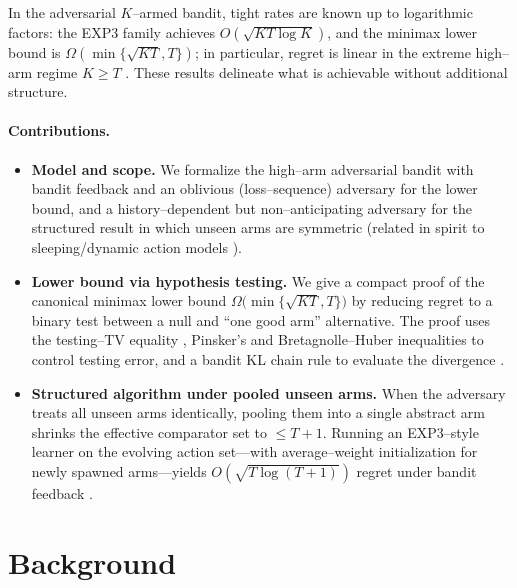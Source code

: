 \documentclass[10pt,twocolumn]{article}
\theoremstyle{definition}
\theoremstyle{remark}
\begin{document}
In the adversarial $K$–armed bandit, tight rates are known up to logarithmic factors: the EXP3 family achieves $O(\sqrt{KT\log K})$, and the minimax lower bound is $\Omega(\min\{\sqrt{KT},T\})$; in particular, regret is linear in the extreme high–arm regime $K\ge T$ \citep{Auer2002Nonstochastic,BubeckCesaBianchi2012,LS20}. These results delineate what is achievable without additional structure.

\paragraph{Contributions.}
\begin{itemize}
  \item \textbf{Model and scope.} We formalize the high–arm adversarial bandit with bandit feedback and an oblivious (loss–sequence) adversary for the lower bound, and a history–dependent but non–anticipating adversary for the structured result in which unseen arms are symmetric (related in spirit to sleeping/dynamic action models \citep{Kleinberg2010Sleeping}).
  \item \textbf{Lower bound via hypothesis testing.} We give a compact proof of the canonical minimax lower bound
        $\Omega\!\big(\min\{\sqrt{KT},T\}\big)$ by reducing regret to a binary test between a null and “one good arm” alternative. The proof uses the testing–TV equality \citep{Tsybakov2009}, Pinsker’s and Bretagnolle–Huber inequalities \citep{CoverThomas2006,BretagnolleHuber1979} to control testing error, and a bandit KL chain rule to evaluate the divergence \citep{Auer2002Nonstochastic,LS20,BubeckCesaBianchi2012}.
  \item \textbf{Structured algorithm under pooled unseen arms.} When the adversary treats all unseen arms identically, pooling them into a single abstract arm shrinks the effective comparator set to $\le T{+}1$. Running an EXP3–style learner on the evolving action set—with average–weight initialization for newly spawned arms—yields $O(\sqrt{T\log(T{+}1)})$ regret under bandit feedback \citep[cf.][]{Auer2002Nonstochastic,Kleinberg2010Sleeping}.
\end{itemize}


\section{Background}
\label{sec:background}
\end{document}
